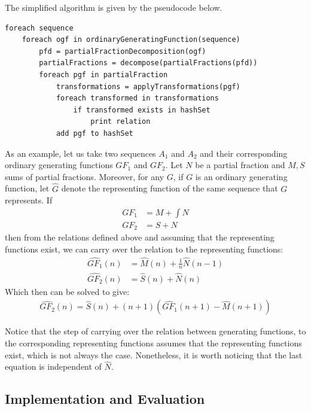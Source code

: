 The simplified algorithm is given by the pseudocode below.
\begin{lstlisting}[style=myScalastyle]
foreach sequence
    foreach ogf in ordinaryGeneratingFunction(sequence)
        pfd = partialFractionDecomposition(ogf)
        partialFractions = decompose(partialFractions(pfd))
        foreach pgf in partialFraction
            transformations = applyTransformations(pgf)
            foreach transformed in transformations
                if transformed exists in hashSet
                    print relation
            add pgf to hashSet
\end{lstlisting}

As an example, let us take two sequences $A_1$ and $A_2$ and their corresponding ordinary generating functions $GF_1$
 and $GF_2$. Let $N$ be a partial fraction and $M,S$ sums of partial fractions. Moreover, for any $G$, if $G$ is an
 ordinary generating function, let $\hat{G}$ denote the representing function of the same sequence that $G$ represents. If
\begin{align}
GF_1 &= M + \int N \\
GF_2 &= S + N
\end{align}
then from the relations defined above and assuming that the representing functions exist, we can carry over the
relation to the representing functions:
\begin{align}
\hat{GF_1}(n) &= \hat{M}(n) + \frac{1}{n}\hat{N}(n-1) \\
\hat{GF_2}(n) &= \hat{S}(n) + \hat{N}(n)
\end{align}
Which then can be solved to give:
\begin{align}
\hat{GF_2}(n) = \hat{S}(n) + (n+1)(\hat{GF_1}(n+1) - \hat{M}(n+1)) \label{eq:transform}
\end{align}

Notice that the step of carrying over the relation between generating functions, to the corresponding representing
functions assumes that the representing functions exist, which is not always the case. Nonetheless, it is worth
noticing that the last equation is independent of $\hat{N}$.

\subsection{Implementation and Evaluation}

